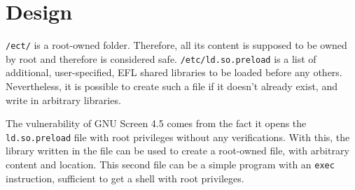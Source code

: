 \section{Design}
{\tt /ect/} is a root-owned folder. Therefore, all its content is supposed to be owned by root and therefore is considered safe. {\tt /etc/ld.so.preload} is a list of additional, user-specified, EFL shared libraries to be loaded before any others. Nevertheless, it is possible to create such a file if it doesn't already exist, and write in arbitrary libraries.


The vulnerability of GNU Screen 4.5 comes from the fact it opens the {\tt ld.so.preload} file with root privileges without any verifications. With this, the library written in the file can be used to create a root-owned file, with arbitrary content and location. This second file can be a simple program with an {\tt exec} instruction, sufficient to get a shell with root privileges.

